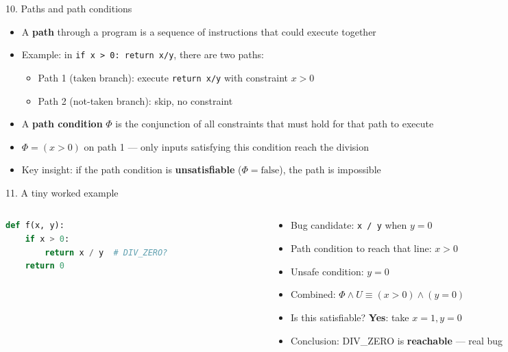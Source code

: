 \documentclass[aspectratio=169]{beamer}
\begin{document}
\begin{frame}{10. Paths and path conditions}
\begin{itemize}
  \item A \textbf{path} through a program is a sequence of instructions that could execute together
  \item Example: in \texttt{if x > 0: return x/y}, there are two paths:
    \begin{itemize}
      \item Path 1 (taken branch): execute \texttt{return x/y} with constraint \(x > 0\)
      \item Path 2 (not-taken branch): skip, no constraint
    \end{itemize}
  \item A \textbf{path condition} \(\Phi\) is the conjunction of all constraints that must hold for that path to execute
  \item \(\Phi = (x > 0)\) on path 1 --- only inputs satisfying this condition reach the division
  \item Key insight: if the path condition is \textbf{unsatisfiable} (\(\Phi = \text{false}\)), the path is impossible
\end{itemize}
\end{frame}

\begin{frame}[fragile]{11. A tiny worked example}
\begin{columns}
\begin{column}{0.45\textwidth}
\begin{lstlisting}[language=Python]
def f(x, y):
    if x > 0:
        return x / y  # DIV_ZERO?
    return 0
\end{lstlisting}
\end{column}
\begin{column}{0.52\textwidth}
\begin{itemize}
  \item Bug candidate: \texttt{x / y} when \(y = 0\)
  \item Path condition to reach that line: \(x > 0\)
  \item Unsafe condition: \(y = 0\)
  \item Combined: \(\Phi \wedge U \equiv (x > 0) \wedge (y = 0)\)
  \item Is this satisfiable? \textbf{Yes}: take \(x=1, y=0\)
  \item Conclusion: DIV\_ZERO is \textbf{reachable} --- real bug
\end{itemize}
\end{column}
\end{columns}
\end{frame}
\end{document}
